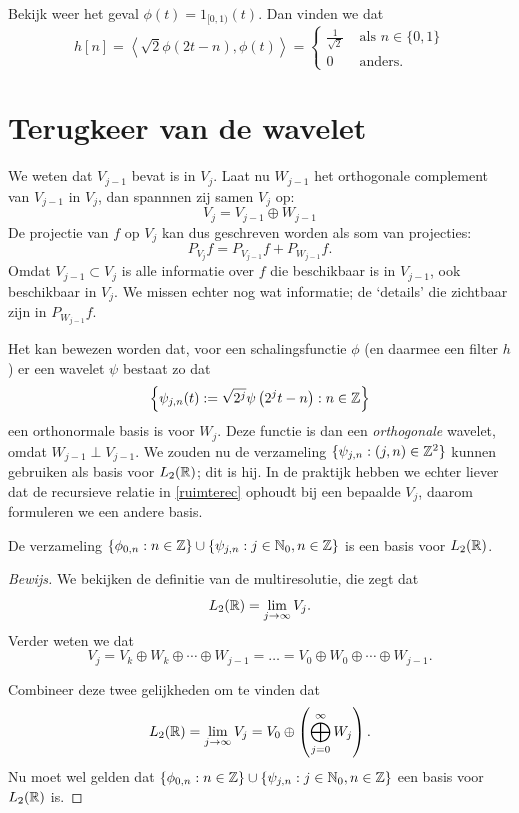 \begin{voorbeeld}
  Bekijk weer het geval $\phi(t) = 1_{[0,1)}(t)$. Dan vinden we dat
    \[
    h[n] = \left\langle \sqrt{2} \phi\left(2t-n\right), \phi(t) \right\rangle = \begin{cases} \frac{1}{\sqrt{2}} & \text{ als } n \in \{0,1\} \\ 0 & \text{ anders.} \end{cases}
    \]
\end{voorbeeld}

\section{Terugkeer van de wavelet}
We weten dat $V_{j-1}$ bevat is in $V_{j}$. Laat nu $W_{j-1}$ het orthogonale complement van $V_{j-1}$ in $V_{j}$,
dan spannnen zij samen $V_j$ op:
\begin{equation}
  \label{ruimterec}
  V_{j} = V_{j-1} \oplus W_{j-1} 
\end{equation}
De projectie van $f$ op $V_{j}$ kan dus geschreven worden als som van projecties:
\begin{equation}
  \label{projectie_rec}
  P_{V_{j}} f = P_{V_{j-1}} f + P_{W_{j-1}} f.
\end{equation}
Omdat $V_{j-1} \subset V_{j}$ is alle informatie over $f$ die beschikbaar is in $V_{j-1}$, ook beschikbaar in $V_{j}$. 
We missen echter nog wat informatie; de `details' die zichtbaar zijn in $P_{W_{j-1}} f$.

Het kan bewezen worden \cite[T7.3]{mallat} dat, voor een schalingsfunctie $\phi$ (en daarmee een filter $h$) 
er een wavelet $\psi$ bestaat zo dat
\[
\left\{ \psi_{j,n}(t) := \sqrt{2^j} \psi\left(2^jt - n\right) : n \in \mathbb{Z} \right\}
\] 
een orthonormale basis is voor $W_j$. Deze functie is dan een \emph{orthogonale} wavelet, omdat $W_{j-1} \perp V_{j-1}$.
We zouden nu de verzameling $\{ \psi_{j,n}: (j,n) \in \mathbb{Z}^2 \}$ kunnen gebruiken als basis voor $L_2(\mathbb{R})$; dit is hij.
In de praktijk hebben we echter liever dat de recursieve relatie in \eqref{ruimterec} ophoudt bij een bepaalde $V_j$,
daarom formuleren we een andere basis.

\begin{lemm}
\label{jarob}
De verzameling $\{ \phi_{0, n}: n \in \mathbb{Z} \} \cup \{ \psi_{j,n}: j \in \mathbb{N}_0, n \in \mathbb{Z} \}$ is een basis voor $L_2(\mathbb{R})$.
\end{lemm}

\begin{proof}[Bewijs]
We bekijken de definitie van de multiresolutie, die zegt dat
\[
	L_2(\mathbb{R}) = \lim_{j\to \infty}V_j.
\]
Verder weten we dat
\begin{equation}
  \label{ruimte_splitsing}
  V_j = V_k \oplus W_k \oplus \cdots \oplus W_{j-1} = \ldots
  = V_0 \oplus W_0 \oplus \cdots \oplus W_{j-1}.
\end{equation}

Combineer deze twee gelijkheden om te vinden dat
\[
	L_2(\mathbb{R}) = \lim_{j \to \infty} V_j = V_0 \oplus \left( \bigoplus_{j=0}^\infty W_j \right).
\]
Nu moet wel gelden dat $\{ \phi_{0, n}: n \in \mathbb{Z} \} \cup \{ \psi_{j,n}: j \in \mathbb{N}_0, n \in \mathbb{Z} \}$ een basis voor $L_2(\mathbb{R})$ is.
\end{proof}


